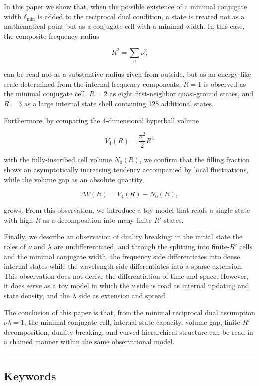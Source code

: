 \documentclass[
]{article}
\begin{document}
In this paper we show that, when the possible existence of a minimal
conjugate width \(\delta_{\min}\) is added to the reciprocal dual
condition, a state is treated not as a mathematical point but as a
conjugate cell with a minimal width. In this case, the composite
frequency radius

\[
R^2=\sum_n \nu_n^2
\]

can be read not as a substantive radius given from outside, but as an
energy-like scale determined from the internal frequency components.
\(R=1\) is observed as the minimal conjugate cell, \(R=2\) as eight
first-neighbor quasi-ground states, and \(R=3\) as a large internal
state shell containing 128 additional states.

Furthermore, by comparing the 4-dimensional hyperball volume

\[
V_4(R)=\frac{\pi^2}{2}R^4
\]

with the fully-inscribed cell volume \(N_0(R)\), we confirm that the
filling fraction shows an asymptotically increasing tendency accompanied
by local fluctuations, while the volume gap as an absolute quantity,

\[
\Delta V(R)=V_4(R)-N_0(R),
\]

grows. From this observation, we introduce a toy model that reads a
single state with high \(R\) as a decomposition into many finite-\(R'\)
states.

Finally, we describe an observation of duality breaking: in the initial
state the roles of \(\nu\) and \(\lambda\) are undifferentiated, and
through the splitting into finite-\(R'\) cells and the minimal conjugate
width, the frequency side differentiates into dense internal states
while the wavelength side differentiates into a sparse extension. This
observation does not derive the differentiation of time and space.
However, it does serve as a toy model in which the \(\nu\) side is read
as internal updating and state density, and the \(\lambda\) side as
extension and spread.

The conclusion of this paper is that, from the minimal reciprocal dual
assumption \(\nu\lambda=1\), the minimal conjugate cell, internal state
capacity, volume gap, finite-\(R'\) decomposition, duality breaking, and
curved hierarchical structure can be read in a chained manner within the
same observational model.

\begin{center}\rule{0.5\linewidth}{0.5pt}\end{center}

\subsection{Keywords}\label{keywords}
\end{document}
